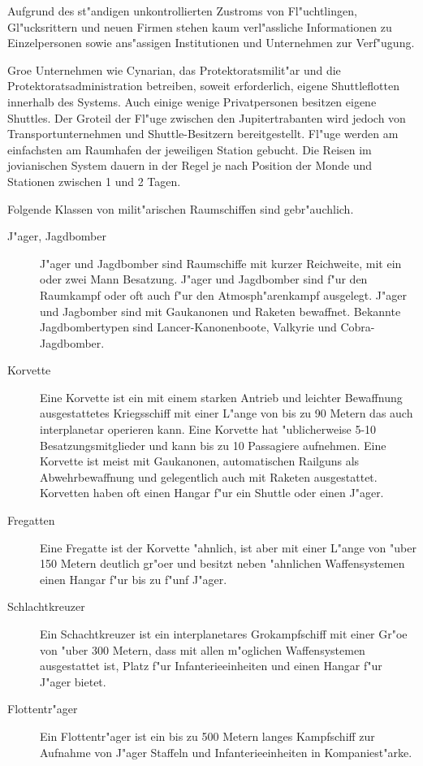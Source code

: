 Aufgrund des st"andigen unkontrollierten Zustroms von Fl"uchtlingen, Gl"ucksrittern und neuen Firmen stehen kaum verl"assliche Informationen zu Einzelpersonen sowie ans"assigen Institutionen und Unternehmen zur Verf"ugung.


Gro\3e Unternehmen wie Cynarian, das Protektoratsmilit"ar und die Protektoratsadministration betreiben, soweit erforderlich, eigene Shuttleflotten innerhalb des Systems. Auch einige wenige Privatpersonen besitzen eigene Shuttles. Der Gro\3teil der Fl"uge zwischen den Jupitertrabanten wird jedoch von Transportunternehmen und Shuttle-Besitzern bereitgestellt. Fl"uge werden am einfachsten am Raumhafen der jeweiligen Station gebucht. Die Reisen im jovianischen System dauern in der Regel je nach Position der Monde und Stationen zwischen 1 und 2 Tagen.


Folgende Klassen von milit"arischen Raumschiffen sind gebr"auchlich.

\begin{description}
\item [J"ager, Jagdbomber] J"ager und Jagdbomber sind Raumschiffe mit kurzer Reichweite, mit ein oder zwei Mann Besatzung.
      J"ager und Jagdbomber sind f"ur den Raumkampf oder oft auch f"ur den Atmosph"arenkampf ausgelegt. J"ager und Jagbomber sind mit Gau\3kanonen und Raketen bewaffnet. Bekannte Jagdbombertypen sind Lancer-Kanonenboote, Valkyrie und Cobra-Jagdbomber.
\item [Korvette] Eine Korvette ist ein mit einem starken Antrieb und leichter Bewaffnung ausgestattetes Kriegsschiff
      mit einer L"ange von bis zu 90 Metern das auch interplanetar operieren kann. Eine Korvette hat "ublicherweise 5-10 Besatzungsmitglieder und kann bis zu 10 Passagiere aufnehmen. Eine Korvette ist meist mit Gau\3kanonen, automatischen Railguns als Abwehrbewaffnung und gelegentlich auch mit Raketen ausgestattet. Korvetten haben oft einen Hangar f"ur ein Shuttle oder einen J"ager.
\item [Fregatten] Eine Fregatte ist der Korvette "ahnlich, ist aber mit einer L"ange von "uber 150 Metern deutlich gr"o\3er und besitzt
      neben "ahnlichen Waffensystemen einen Hangar f"ur bis zu f"unf J"ager.
\item [Schlachtkreuzer] Ein Schachtkreuzer ist ein interplanetares Gro\3kampfschiff mit einer Gr"o\3e von "uber 300 Metern,
      dass mit allen m"oglichen Waffensystemen ausgestattet ist, Platz f"ur Infanterieeinheiten und einen Hangar f"ur J"ager bietet.
\item [Flottentr"ager] Ein Flottentr"ager ist ein bis zu 500 Metern langes Kampfschiff zur Aufnahme von J"ager Staffeln und 
      Infanterieeinheiten in Kompaniest"arke.
\end{description}

